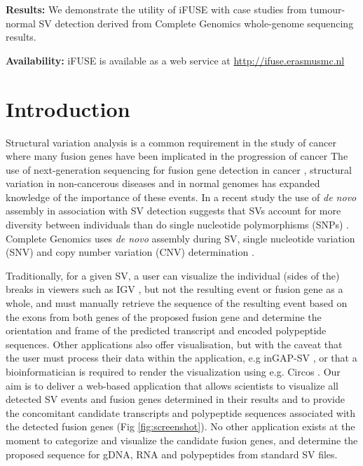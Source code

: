 \textbf{Results:} We demonstrate the utility of iFUSE with case studies from tumour-normal SV detection derived from Complete Genomics whole-genome sequencing results.

\textbf{Availability:} iFUSE is available as a web service at \url{http://ifuse.erasmusmc.nl}


\section*{Introduction}

Structural variation analysis is a common requirement in the study of cancer where many fusion genes have been implicated in the progression of cancer \cite{review1, review2}
The use of next-generation sequencing for fusion gene detection in cancer \cite{edgren, fusionmap, defuse}, structural variation in non-cancerous diseases \cite{rareallele, rareallele2} and in normal genomes \cite{1000Genomes} has expanded knowledge of the importance of these events.
In a recent study the use of \textit{de novo} assembly in association with SV detection suggests that SVs account for more diversity between individuals than do single nucleotide polymorphisms (SNPs) \cite{li}. Complete Genomics uses \textit{de novo} assembly during SV, single nucleotide variation (SNV) and copy number variation (CNV) determination \cite{carnevali}.

Traditionally, for a given SV, a user can visualize the individual (sides of the) breaks in viewers such as IGV \cite{igv, igv2}, but not the resulting event or fusion gene as a whole, and must manually retrieve the sequence of the resulting event based on the exons from both genes of the proposed fusion gene and determine the orientation and frame of the predicted transcript and encoded polypeptide sequences. Other applications also offer visualisation, but with the caveat that the user must process their data within the application, e.g inGAP-SV \cite{ingap-sv}, or that a bioinformatician is required to render the visualization using e.g. Circos \cite{circos}. Our aim is to deliver a web-based application that allows scientists to visualize all detected SV events and fusion genes determined in their results and to provide the concomitant candidate transcripts and polypeptide sequences associated with the detected fusion genes (Fig \ref{fig:screenshot}). No other application exists at the moment to categorize and visualize the candidate fusion genes, and determine the proposed sequence for gDNA, RNA and polypeptides from standard SV files.

